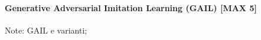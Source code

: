\newpage
\paragraph{Generative Adversarial Imitation Learning (GAIL) [MAX 5]}
Note: GAIL e varianti;

\label{para:gail}